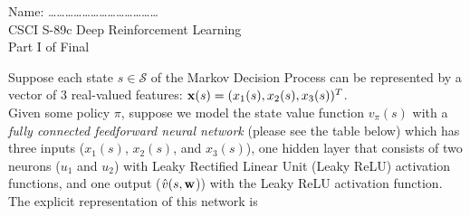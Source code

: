 \documentclass[12pt]{letter}
\begin{document}
\begin{flushleft}
{\sc Name: \ldots\ldots\ldots\ldots\ldots\ldots\ldots\ldots\ldots\ldots\ldots\ldots\ldots}\\
CSCI S-89c Deep Reinforcement Learning\\
Part I of Final\\
\end{flushleft}

Suppose each state $s\in\mathcal{S}$ of the Markov Decision Process can be represented by a vector of 3 real-valued features: ${\bf x}(s) = (x_1(s), x_2(s), x_3(s))^T$.\medskip\\
Given some policy $\pi$, suppose we model the state value function $v_\pi(s)$ with a {\it fully connected feedforward neural network} (please see the table below) which has three inputs ($x_{1}(s)$, $x_2(s)$, and $x_{3}(s)$), one hidden layer that consists of two neurons ($u_1$ and $u_2$) with Leaky Rectified Linear Unit (Leaky ReLU) activation functions, and one output ($\hat{v}(s,{\bf w}$)) with the Leaky ReLU activation function.\medskip\\
The explicit representation of this network is
\end{document}
